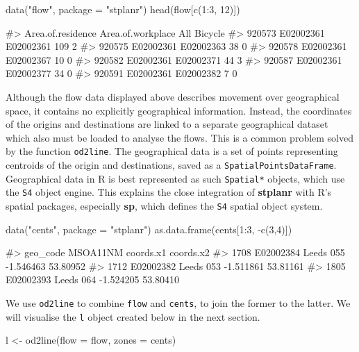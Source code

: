 \begin{Schunk}
\begin{Sinput}
data("flow", package = "stplanr")
head(flow[c(1:3, 12)])
\end{Sinput}
\begin{Soutput}
#>        Area.of.residence Area.of.workplace All Bicycle
#> 920573         E02002361         E02002361 109       2
#> 920575         E02002361         E02002363  38       0
#> 920578         E02002361         E02002367  10       0
#> 920582         E02002361         E02002371  44       3
#> 920587         E02002361         E02002377  34       0
#> 920591         E02002361         E02002382   7       0
\end{Soutput}
\end{Schunk}

Although the flow data displayed above describes movement over
geographical space, it contains no explicitly geographical information.
Instead, the coordinates of the origins and destinations are linked to a
separate geographical dataset which also must be loaded to analyse the
flows. This is a common problem solved by the function \texttt{od2line}.
The geographical data is a set of points representing centroids of the
origin and destinations, saved as a \texttt{SpatialPointsDataFrame}.
Geographical data in R is best represented as such \texttt{Spatial*}
objects, which use the \texttt{S4} object engine. This explains the
close integration of \textbf{stplanr} with R's spatial packages,
especially \textbf{sp}, which defines the \texttt{S4} spatial object
system.

\begin{Schunk}
\begin{Sinput}
data("cents", package = "stplanr")
as.data.frame(cents[1:3, -c(3,4)])
\end{Sinput}
\begin{Soutput}
#>       geo_code  MSOA11NM coords.x1 coords.x2
#> 1708 E02002384 Leeds 055 -1.546463  53.80952
#> 1712 E02002382 Leeds 053 -1.511861  53.81161
#> 1805 E02002393 Leeds 064 -1.524205  53.80410
\end{Soutput}
\end{Schunk}

We use \texttt{od2line} to combine \texttt{flow} and \texttt{cents}, to
join the former to the latter. We will visualise the \texttt{l} object
created below in the next section.

\begin{Schunk}
\begin{Sinput}
l <- od2line(flow = flow, zones = cents)
\end{Sinput}
\end{Schunk}

